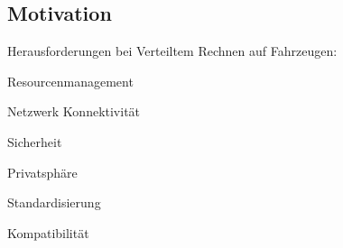\subsection*{Motivation}
\begin{notes}
    \item Herausforderungen bei Verteiltem Rechnen auf Fahrzeugen:
    \begin{notes}
        \item Resourcenmanagement
        \item Netzwerk Konnektivität
        \item Sicherheit
        \item Privatsphäre
        \item Standardisierung
        \item Kompatibilität
    \end{notes}
\end{notes}

